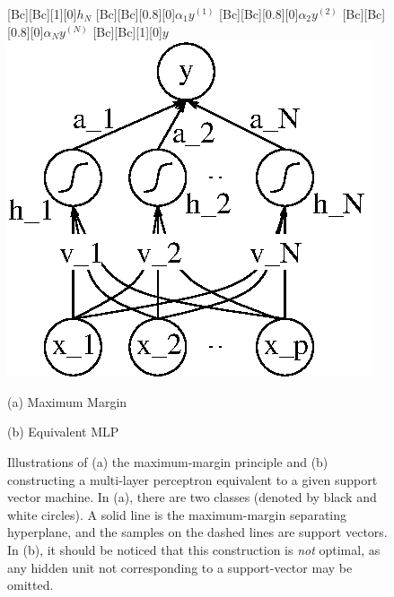 \documentclass[dissertation,nocontribution,draft*]{aaltoseries}
\begin{document}
\begin{figure}[t]
\begin{minipage}{0.48\textwidth}
        [Bc][Bc][1][0]{$h_N$}
        [Bc][Bc][0.8][0]{$\alpha_1 y^{(1)}$}
        [Bc][Bc][0.8][0]{$\alpha_2 y^{(2)}$}
        [Bc][Bc][0.8][0]{$\alpha_N y^{(N)}$}
        [Bc][Bc][1][0]{$y$}
        \includegraphics[width=0.75\columnwidth]{figures/mlp_svm.eps}
    \end{minipage}

    \vspace{2mm}
    \begin{minipage}{0.48\textwidth}
        \centering
        \small
        (a) Maximum Margin
    \end{minipage}
    \begin{minipage}{0.48\textwidth}
        \centering
        \small
        (b) Equivalent MLP
    \end{minipage}
    \caption{Illustrations of (a) the maximum-margin
    principle and (b) constructing a multi-layer
    perceptron equivalent to a given support vector machine.
    In (a), there are two classes (denoted by black and
    white circles). A solid line is the maximum-margin
    separating hyperplane, and the samples on the dashed
    lines are support vectors. In (b), it should be noticed
    that this construction is \textit{not} optimal, as any
    hidden unit not corresponding to a support-vector may be
    omitted.}
    \label{fig:svm}
\end{figure}

\end{document}
